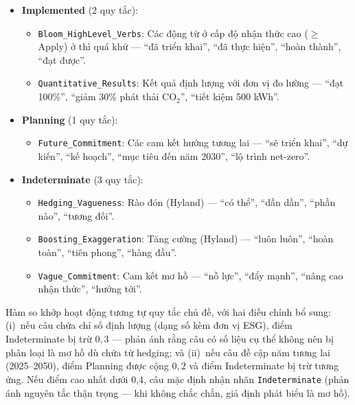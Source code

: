 \begin{itemize}
    \item \textbf{Implemented} (2 quy tắc):
    \begin{itemize}
        \item \texttt{Bloom\_HighLevel\_Verbs}: Các động từ ở cấp độ nhận thức cao ($\geq$ Apply) ở thì quá khứ --- ``đã triển khai'', ``đã thực hiện'', ``hoàn thành'', ``đạt được''.
        \item \texttt{Quantitative\_Results}: Kết quả định lượng với đơn vị đo lường --- ``đạt 100\%'', ``giảm 30\% phát thải CO$_2$'', ``tiết kiệm 500 kWh''.
    \end{itemize}

    \item \textbf{Planning} (1 quy tắc):
    \begin{itemize}
        \item \texttt{Future\_Commitment}: Các cam kết hướng tương lai --- ``sẽ triển khai'', ``dự kiến'', ``kế hoạch'', ``mục tiêu đến năm 2030'', ``lộ trình net-zero''.
    \end{itemize}

    \item \textbf{Indeterminate} (3 quy tắc):
    \begin{itemize}
        \item \texttt{Hedging\_Vagueness}: Rào đón (Hyland) --- ``có thể'', ``dần dần'', ``phần nào'', ``tương đối''.
        \item \texttt{Boosting\_Exaggeration}: Tăng cường (Hyland) --- ``luôn luôn'', ``hoàn toàn'', ``tiên phong'', ``hàng đầu''.
        \item \texttt{Vague\_Commitment}: Cam kết mơ hồ --- ``nỗ lực'', ``đẩy mạnh'', ``nâng cao nhận thức'', ``hướng tới''.
    \end{itemize}
\end{itemize}

Hàm so khớp hoạt động tương tự quy tắc chủ đề, với hai điều chỉnh bổ sung: (i)~nếu câu chứa chỉ số định lượng (dạng số kèm đơn vị ESG), điểm Indeterminate bị trừ $0{,}3$ --- phản ánh rằng câu có số liệu cụ thể không nên bị phân loại là mơ hồ dù chứa từ hedging; và (ii)~nếu câu đề cập năm tương lai (2025--2050), điểm Planning được cộng $0{,}2$ và điểm Indeterminate bị trừ tương ứng. Nếu điểm cao nhất dưới 0{,}4, câu mặc định nhận nhãn \texttt{Indeterminate} (phản ánh nguyên tắc thận trọng --- khi không chắc chắn, giả định phát biểu là mơ hồ).


